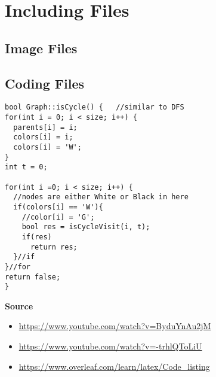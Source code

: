 \documentclass[10pt, letterpaper]{article}
\begin{document}
\section{Including Files}
\subsection{Image Files}
\subsection{Coding Files}
\lstset{style=basicstyle}
\begin{lstlisting}[title=Function: Graph::isCycle()]
bool Graph::isCycle() {   //similar to DFS
for(int i = 0; i < size; i++) {
  parents[i] = i;
  colors[i] = i;
  colors[i] = 'W';
}
int t = 0;

for(int i =0; i < size; i++) {
  //nodes are either White or Black in here
  if(colors[i] == 'W'){
    //color[i] = 'G';
    bool res = isCycleVisit(i, t);
    if(res)
      return res;
  }//if
}//for
return false;
}
\end{lstlisting}
\textbf{Source}
\begin{itemize}
  \item \url{https://www.youtube.com/watch?v=ByduYnAu2jM}
  \item \url{https://www.youtube.com/watch?v=-trhlQToLiU}
  \item \url{https://www.overleaf.com/learn/latex/Code_listing}
\end{itemize}
\end{document}
